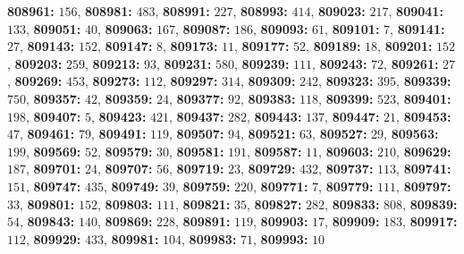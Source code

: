 \textsf{\bfseries 808961:} $156$, \textsf{\bfseries 808981:} $483$, \textsf{\bfseries 808991:} $227$, \textsf{\bfseries 808993:} $414$, \textsf{\bfseries 809023:} $217$, \textsf{\bfseries 809041:} $133$, \textsf{\bfseries 809051:} $40$, \textsf{\bfseries 809063:} $167$, \textsf{\bfseries 809087:} $186$, \textsf{\bfseries 809093:} $61$, \textsf{\bfseries 809101:} $7$, \textsf{\bfseries 809141:} $27$, \textsf{\bfseries 809143:} $152$, \textsf{\bfseries 809147:} $8$, \textsf{\bfseries 809173:} $11$, \textsf{\bfseries 809177:} $52$, \textsf{\bfseries 809189:} $18$, \textsf{\bfseries 809201:} $152$, \textsf{\bfseries 809203:} $259$, \textsf{\bfseries 809213:} $93$, \textsf{\bfseries 809231:} $580$, \textsf{\bfseries 809239:} $111$, \textsf{\bfseries 809243:} $72$, \textsf{\bfseries 809261:} $27$, \textsf{\bfseries 809269:} $453$, \textsf{\bfseries 809273:} $112$, \textsf{\bfseries 809297:} $314$, \textsf{\bfseries 809309:} $242$, \textsf{\bfseries 809323:} $395$, \textsf{\bfseries 809339:} $750$, \textsf{\bfseries 809357:} $42$, \textsf{\bfseries 809359:} $24$, \textsf{\bfseries 809377:} $92$, \textsf{\bfseries 809383:} $118$, \textsf{\bfseries 809399:} $523$, \textsf{\bfseries 809401:} $198$, \textsf{\bfseries 809407:} $5$, \textsf{\bfseries 809423:} $421$, \textsf{\bfseries 809437:} $282$, \textsf{\bfseries 809443:} $137$, \textsf{\bfseries 809447:} $21$, \textsf{\bfseries 809453:} $47$, \textsf{\bfseries 809461:} $79$, \textsf{\bfseries 809491:} $119$, \textsf{\bfseries 809507:} $94$, \textsf{\bfseries 809521:} $63$, \textsf{\bfseries 809527:} $29$, \textsf{\bfseries 809563:} $199$, \textsf{\bfseries 809569:} $52$, \textsf{\bfseries 809579:} $30$, \textsf{\bfseries 809581:} $191$, \textsf{\bfseries 809587:} $11$, \textsf{\bfseries 809603:} $210$, \textsf{\bfseries 809629:} $187$, \textsf{\bfseries 809701:} $24$, \textsf{\bfseries 809707:} $56$, \textsf{\bfseries 809719:} $23$, \textsf{\bfseries 809729:} $432$, \textsf{\bfseries 809737:} $113$, \textsf{\bfseries 809741:} $151$, \textsf{\bfseries 809747:} $435$, \textsf{\bfseries 809749:} $39$, \textsf{\bfseries 809759:} $220$, \textsf{\bfseries 809771:} $7$, \textsf{\bfseries 809779:} $111$, \textsf{\bfseries 809797:} $33$, \textsf{\bfseries 809801:} $152$, \textsf{\bfseries 809803:} $111$, \textsf{\bfseries 809821:} $35$, \textsf{\bfseries 809827:} $282$, \textsf{\bfseries 809833:} $808$, \textsf{\bfseries 809839:} $54$, \textsf{\bfseries 809843:} $140$, \textsf{\bfseries 809869:} $228$, \textsf{\bfseries 809891:} $119$, \textsf{\bfseries 809903:} $17$, \textsf{\bfseries 809909:} $183$, \textsf{\bfseries 809917:} $112$, \textsf{\bfseries 809929:} $433$, \textsf{\bfseries 809981:} $104$, \textsf{\bfseries 809983:} $71$, \textsf{\bfseries 809993:} $10$
